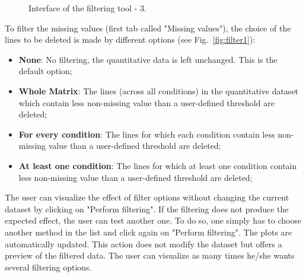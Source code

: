 \documentclass[12pt]{article}
\begin{document}
\begin {figure}
\centering
{}
\caption{Interface of the filtering tool - 3.}\label{fig:filter3}
\end {figure}

To filter the missing values (first tab called "Missing values"), the choice of the lines to be deleted is made by different options (see Fig.~\ref{fig:filter1}):
\begin {itemize}
  \item\textbf{None}: No filtering, the quantitative data is left unchanged. This is the default option;
  \item\textbf{Whole Matrix}: The lines (across all conditions) in the quantitative dataset which contain less non-missing value than a user-defined threshold are deleted;
  \item\textbf{For every condition}: The lines for which each condition contain less non-missing value than a user-defined threshold are deleted;
  \item\textbf{At least one condition}: The lines for which at least one condition contain less non-missing value than a user-defined threshold are deleted;
\end {itemize}

The user can visualize the effect of filter options without changing the current dataset by clicking on "Perform filtering". If the filtering does not produce the expected effect, the user can test another one. To do so, one simply has to choose another method in the list and click again on "Perform filtering". The plots are automatically updated. This action does not modify the dataset but offers a preview of the filtered data. The user can visualize as many times he/she wants several filtering options. 
\end{document}
